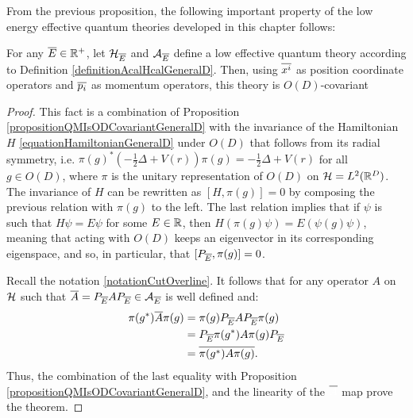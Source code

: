 From the previous proposition, the following important property of the low energy effective quantum theories developed in this chapter follows:
\begin{theorem}\label{theoremGeneralDEffectiveLowEnergyQuantumIsODCovariant}
For any $\overline{E} \in \mathbb{R}^+$, let $\mathcal H_{\overline{E}}$ and $\mathcal A_{\overline{E}}$ define a low effective quantum theory according to Definition \ref{definitionAcalHcalGeneralD}. Then, using $\overline{x^i}$ as position coordinate operators and $\overline{p_i}$ as momentum operators, this theory is $O(D)$-covariant
\end{theorem}
\begin{proof}
This fact is a combination of Proposition \ref{propositionQMIsODCovariantGeneralD} with the invariance of the Hamiltonian $H$ \eqref{equationHamiltonianGeneralD} under $O(D)$ that follows from its radial symmetry, i.e. $\pi(g)^* (-\frac{1}{2} \Delta + V(r)) \pi(g) = -\frac{1}{2} \Delta + V(r)$ for all $g \in O(D)$, where $\pi$ is the unitary representation of $O(D)$ on $\mathcal H = L^2(\mathbb{R}^D)$. The invariance of $H$ can be rewritten as $[H, \pi(g)] = 0$ by composing the previous relation with $\pi(g)$ to the left. The last relation implies that if $\psi$ is such that $H \psi = E \psi$ for some $E \in \mathbb{R}$, then $H(\pi(g)\psi) = E(\psi(g)\psi)$, meaning that acting with $O(D)$ keeps an eigenvector in its corresponding eigenspace, and so, in particular, that $[P_{\overline{E}}, \pi(g)] = 0$.

Recall the notation \ref{notationCutOverline}. It follows that for any operator $A$ on $\mathcal H$ such that $\overline{A} = P_{\overline{E}} A P_{\overline{E}} \in \mathcal A_{\overline{E}}$ is well defined and:
\begin{align*}
    \pi(g^*) \overline{A} \pi(g) 
      &= \pi(g)P_{\overline{E}} A P_{\overline{E}} \pi(g)\\
      &= P_{\overline{E}} \pi(g^*) A \pi(g) P_{\overline{E}}\\
      &= \overline{\pi(g^*) A \pi(g)}.
\end{align*}
Thus, the combination of the last equality with Proposition \ref{propositionQMIsODCovariantGeneralD}, and the linearity of the $\cut{\color{white} A}$ map prove the theorem.
\end{proof}


